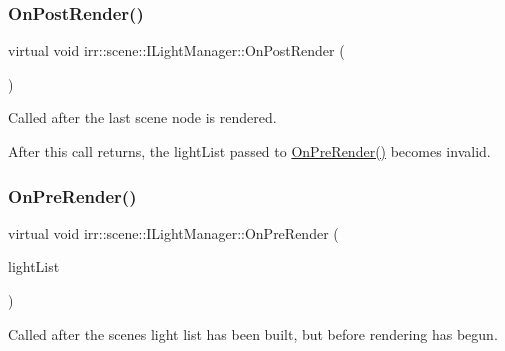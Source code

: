 \subsubsection{\texorpdfstring{On\+Post\+Render()}{OnPostRender()}}
{\footnotesize\ttfamily virtual void irr\+::scene\+::\+I\+Light\+Manager\+::\+On\+Post\+Render (\begin{DoxyParamCaption}\item[{void}]{ }\end{DoxyParamCaption})\hspace{0.3cm}{\ttfamily [pure virtual]}}



Called after the last scene node is rendered. 

After this call returns, the light\+List passed to \hyperlink{classirr_1_1scene_1_1ILightManager_a07d93dbbdba50c7a26d1c293949e3781}{On\+Pre\+Render()} becomes invalid. \mbox{\label{classirr_1_1scene_1_1ILightManager_a07d93dbbdba50c7a26d1c293949e3781}} 
\subsubsection{\texorpdfstring{On\+Pre\+Render()}{OnPreRender()}}
{\footnotesize\ttfamily virtual void irr\+::scene\+::\+I\+Light\+Manager\+::\+On\+Pre\+Render (\begin{DoxyParamCaption}\item[{\hyperlink{classirr_1_1core_1_1array}{core\+::array}$<$ \hyperlink{classirr_1_1scene_1_1ISceneNode}{I\+Scene\+Node} $\ast$$>$ \&}]{light\+List }\end{DoxyParamCaption})\hspace{0.3cm}{\ttfamily [pure virtual]}}



Called after the scene\textquotesingle{}s light list has been built, but before rendering has begun. 

